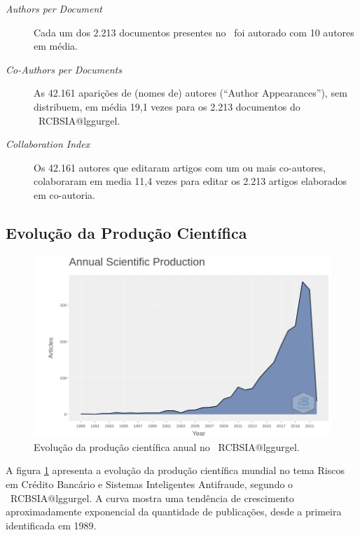 \begin{description}
    \item [\textit{Authors per Document}] Cada um dos 2.213 documentos presentes no \dataset\ foi autorado com 10 autores em média.
    \item [\textit{Co-Authors per Documents}] As 42.161 aparições de (nomes de) autores (``Author Appearances''), sem distribuem, em média 19,1 vezes para os 2.213 documentos do \dataset\   RCBSIA@lggurgel.
    \item [\textit{Collaboration Index}] Os 42.161 autores que editaram artigos com um ou mais co-autores, colaboraram em media 11,4 vezes para editar os 2.213 artigos elaborados em co-autoria.
\end{description}

\subsection{Evolução da Produção Científica}

\begin{figure}
    \centering
    \includegraphics[width=1\textwidth]{experiments/lggurgel/AnaliseBibliometrica/RiscoBancario/Figs/Descritiva/RCBSIA-ProducaoCientificaAnual.png}
    \caption{Evolução da produção científica anual no \dataset\   RCBSIA@lggurgel.}
    \label{fig:evol:anual:RCBSIA@lggurgel}
\end{figure}

A figura \ref{fig:evol:anual:RCBSIA@lggurgel} apresenta a evolução da produção científica mundial no tema Riscos em Crédito Bancário e Sistemas Inteligentes Antifraude, segundo o \dataset\   RCBSIA@lggurgel. A curva mostra uma tendência de crescimento aproximadamente exponencial da quantidade de publicações, desde a primeira identificada em 1989.

